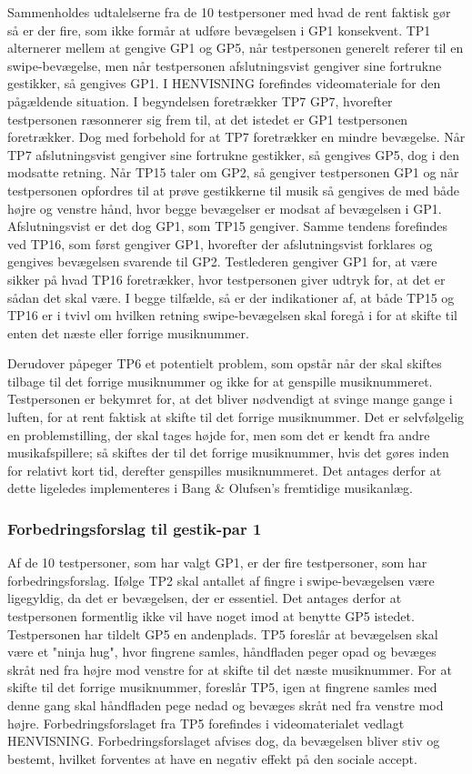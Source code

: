 Sammenholdes udtalelserne fra de 10 testpersoner med hvad de rent faktisk gør så er der fire, som ikke formår at udføre bevægelsen i GP1 konsekvent. TP1 alternerer mellem at gengive GP1 og GP5, når testpersonen generelt referer til en swipe-bevægelse, men når testpersonen afslutningsvist gengiver sine fortrukne gestikker, så gengives GP1. I HENVISNING forefindes videomateriale for den pågældende situation. I begyndelsen foretrækker TP7 GP7, hvorefter testpersonen ræsonnerer sig frem til, at det istedet er GP1 testpersonen foretrækker. Dog med forbehold for at TP7 foretrækker en mindre bevægelse. Når TP7 afslutningsvist gengiver sine fortrukne gestikker, så gengives GP5, dog i den modsatte retning. Når TP15 taler om GP2, så gengiver testpersonen GP1 og når testpersonen opfordres til at prøve gestikkerne til musik så gengives de med både højre og venstre hånd, hvor begge bevægelser er modsat af bevægelsen i GP1. Afslutningsvist er det dog GP1, som TP15 gengiver. Samme tendens forefindes ved TP16, som først gengiver GP1, hvorefter der afslutningsvist forklares og gengives bevægelsen svarende til GP2. Testlederen gengiver GP1 for, at være sikker på hvad TP16 foretrækker, hvor testpersonen giver udtryk for, at det er sådan det skal være. I begge tilfælde, så er der indikationer af, at både TP15 og TP16 er i tvivl om hvilken retning swipe-bevægelsen skal foregå i for at skifte til enten det næste eller forrige musiknummer.

Derudover påpeger TP6 et potentielt problem, som opstår når der skal skiftes tilbage til det forrige musiknummer og ikke for at genspille musiknummeret. Testpersonen er bekymret for, at det bliver nødvendigt at svinge mange gange i luften, for at rent faktisk at skifte til det forrige musiknummer. Det er selvfølgelig en problemstilling, der skal tages højde for, men som det er kendt fra andre musikafspillere; så skiftes der til det forrige musiknummer, hvis det gøres inden for relativt kort tid, derefter genspilles musiknummeret. Det antages derfor at dette ligeledes implementeres i Bang $\&$ Olufsen's fremtidige musikanlæg. 
%
\subsubsection{Forbedringsforslag til gestik-par 1}
\label{TestresultaterValgAfGestikkerForbedringGP1Skift}
%
Af de 10 testpersoner, som har valgt GP1, er der fire testpersoner, som har forbedringsforslag. Ifølge TP2 skal antallet af fingre i swipe-bevægelsen være ligegyldig, da det er bevægelsen, der er essentiel. Det antages derfor at testpersonen formentlig ikke vil have noget imod at benytte GP5 istedet. Testpersonen har tildelt GP5 en andenplads. TP5 foreslår at bevægelsen skal være et "ninja hug", hvor fingrene samles, håndfladen peger opad og bevæges skråt ned fra højre mod venstre for at skifte til det næste musiknummer. For at skifte til det forrige musiknummer, foreslår TP5, igen at fingrene samles med denne gang skal håndfladen pege nedad og bevæges skråt ned fra venstre mod højre. Forbedringsforslaget fra TP5 forefindes i videomaterialet vedlagt HENVISNING. Forbedringsforslaget afvises dog, da bevægelsen bliver stiv og bestemt, hvilket forventes at have en negativ effekt på den sociale accept.

